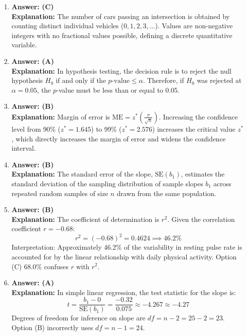 \begin{enumerate}[leftmargin=1.5em]
  \item \textbf{Answer: (C)} \\
  \textbf{Explanation:} The number of cars passing an intersection is obtained by counting distinct individual vehicles ($0, 1, 2, 3, \dots$). Values are non-negative integers with no fractional values possible, defining a discrete quantitative variable.

  \item \textbf{Answer: (A)} \\
  \textbf{Explanation:} In hypothesis testing, the decision rule is to reject the null hypothesis $H_0$ if and only if the $p\text{-value} \le \alpha$. Therefore, if $H_0$ was rejected at $\alpha = 0.05$, the $p$-value must be less than or equal to 0.05.

  \item \textbf{Answer: (B)} \\
  \textbf{Explanation:} Margin of error is $\text{ME} = z^* \left(\frac{\sigma}{\sqrt{n}}\right)$. Increasing the confidence level from 90\% ($z^* = 1.645$) to 99\% ($z^* = 2.576$) increases the critical value $z^*$, which directly increases the margin of error and widens the confidence interval.

  \item \textbf{Answer: (B)} \\
  \textbf{Explanation:} The standard error of the slope, $\text{SE}(b_1)$, estimates the standard deviation of the sampling distribution of sample slopes $b_1$ across repeated random samples of size $n$ drawn from the same population.

  \item \textbf{Answer: (B)} \\
  \textbf{Explanation:} The coefficient of determination is $r^2$. Given the correlation coefficient $r = -0.68$:
  \[ r^2 = (-0.68)^2 = 0.4624 \implies 46.2\% \]
  Interpretation: Approximately 46.2\% of the variability in resting pulse rate is accounted for by the linear relationship with daily physical activity. Option (C) 68.0\% confuses $r$ with $r^2$.

  \item \textbf{Answer: (A)} \\
  \textbf{Explanation:} In simple linear regression, the test statistic for the slope is:
  \[ t = \frac{b_1 - 0}{\text{SE}(b_1)} = \frac{-0.32}{0.075} \approx -4.267 \approx -4.27 \]
  Degrees of freedom for inference on slope are $df = n - 2 = 25 - 2 = 23$. Option (B) incorrectly uses $df = n - 1 = 24$.
\end{enumerate}

